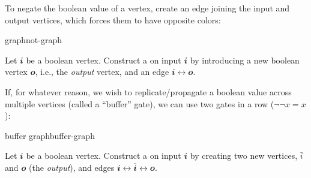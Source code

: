 To negate the boolean value of a vertex, create an edge joining the input and
output vertices, which forces them to have opposite colors:

\begin{definition}{\NOT{} graph}{not-graph}

  Let \(𝒊\) be a boolean vertex.  Construct a  on input \(𝒊\)
  by introducing a new boolean vertex \(𝒐\), i.e., the \emph{output} vertex, and
  an edge \(𝒊↔𝒐\).

  \begin{center}
  \end{center}

\end{definition}

If, for whatever reason, we wish to replicate/propagate a boolean value across
multiple vertices (called a ``buffer'' gate), we can use two \NOT{} gates in a
row (\(¬¬x=x\)):

\begin{definition}{buffer graph}{buffer-graph}

  Let \(𝒊\) be a boolean vertex.  Construct a  on input \(𝒊\)
  by creating two new vertices, \(\bar i\) and \(𝒐\) (the \emph{output}), and
  edges \(𝒊↔\bar 𝒊↔𝒐\).

  \begin{center}
  \end{center}

\end{definition}

